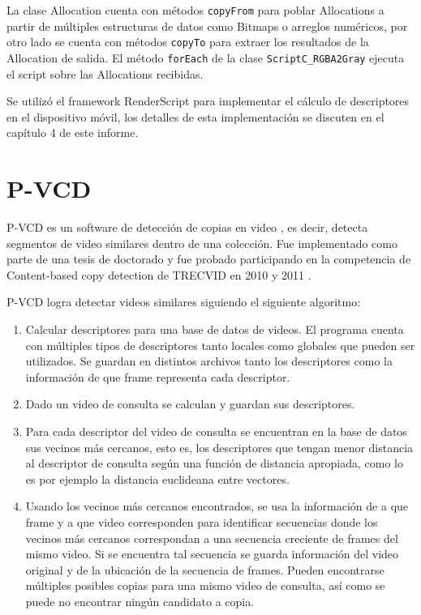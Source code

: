 La clase Allocation cuenta con métodos \texttt{copyFrom} para poblar Allocations a partir de múltiples estructuras de datos como Bitmaps o arreglos numéricos, por otro lado se cuenta con métodos \texttt{copyTo} para extraer los resultados de la Allocation de salida. El método \texttt{forEach} de la clase \texttt{ScriptC\_RGBA2Gray} ejecuta el script sobre las Allocations recibidas.

Se utilizó el framework RenderScript para implementar el cálculo de descriptores en el dispositivo móvil, los detalles de esta implementación se discuten en el capítulo 4 de este informe.

\section{P-VCD}\label{pvcd}
P-VCD es un software de detección de copias en video \cite{p-vcd1}, es decir, detecta segmentos de video similares dentro de una colección. Fue implementado como parte de una tesis de doctorado y fue probado participando en la competencia de Content-based copy detection de TRECVID en 2010 y 2011 \cite{p-vcd2}.

P-VCD logra detectar videos similares siguiendo el siguiente algoritmo:
\begin{enumerate}
\item Calcular descriptores para una base de datos de videos. El programa cuenta con múltiples tipos de descriptores tanto locales como globales que pueden ser utilizados. Se guardan en distintos archivos tanto los descriptores como la información de que frame representa cada descriptor.
\item Dado un video de consulta se calculan y guardan sus descriptores.
\item Para cada descriptor del video de consulta se encuentran en la base de datos sus vecinos más cercanos, esto es, los descriptores que tengan menor distancia al descriptor de consulta según una función de distancia apropiada, como lo es por ejemplo la distancia euclideana entre vectores.
\item Usando los vecinos más cercanos encontrados, se usa la información de a que frame y a que video corresponden para identificar secuencias donde los vecinos más cercanos correspondan a una secuencia creciente de frames del mismo video. Si se encuentra tal secuencia se guarda información del video original y de la ubicación de la secuencia de frames. Pueden encontrarse múltiples posibles copias para una mismo video de consulta, así como se puede no encontrar ningún candidato a copia. 
\end{enumerate}

